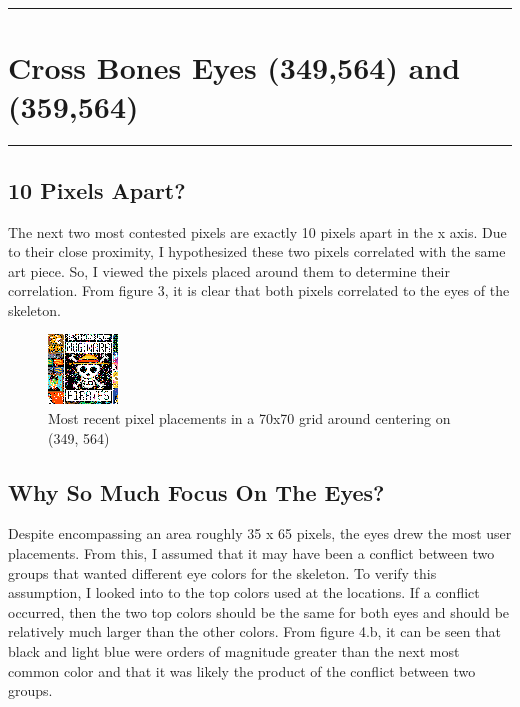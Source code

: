 {\color{gray}\hrule}
\section{Cross Bones Eyes (349,564) and (359,564)}
{\color{gray}\hrule}

\subsection{10 Pixels Apart?}

The next two most contested pixels are exactly 10 pixels apart in the x axis. Due to their close proximity, I hypothesized these two pixels correlated with the same art piece. So, I viewed the pixels placed around them to determine their correlation. From figure 3, it is clear that both pixels correlated to the eyes of the skeleton. 

\begin{figure}[H]
\centering
\includegraphics{visuals/349_564_35_80_mode_1}
    \caption{Most recent pixel placements in a 70x70 grid around centering on (349, 564) }
\end{figure}

\subsection{Why So Much Focus On The Eyes?}

Despite encompassing an area roughly 35 x 65 pixels, the eyes drew the most user placements. From this, I assumed that it may have been a conflict between two groups that wanted different eye colors for the skeleton. To verify this assumption, I looked into to the top colors used at the locations. If a conflict occurred, then the two top colors should be the same for both eyes and should be relatively much larger than the other colors. 
From figure 4.b, it can be seen that black and light blue were orders of magnitude greater than the next most common color and that it was likely the product of the conflict between two groups.


